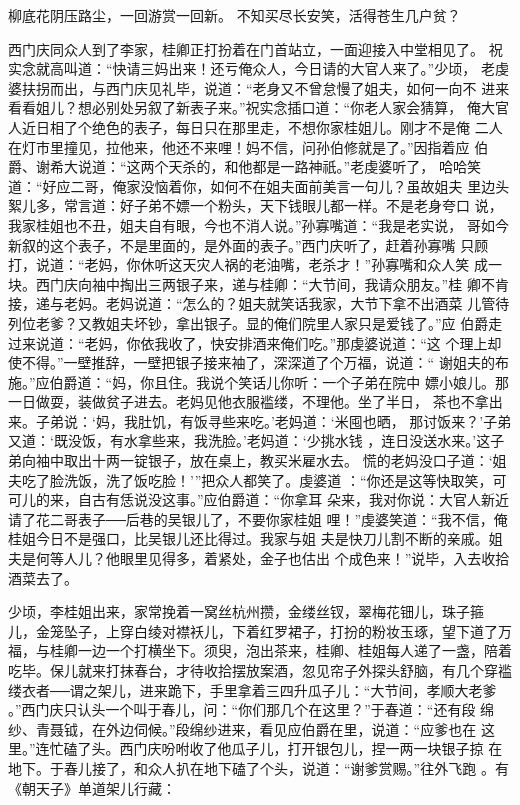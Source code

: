 柳底花阴压路尘，一回游赏一回新。
不知买尽长安笑，活得苍生几户贫？

西门庆同众人到了李家，桂卿正打扮着在门首站立，一面迎接入中堂相见了。
祝实念就高叫道：“快请三妈出来！还亏俺众人，今日请的大官人来了。”少顷，
老虔婆扶拐而出，与西门庆见礼毕，说道：“老身又不曾怠慢了姐夫，如何一向不
进来看看姐儿？想必别处另叙了新表子来。”祝实念插口道：“你老人家会猜算，
俺大官人近日相了个绝色的表子，每日只在那里走，不想你家桂姐儿。刚才不是俺
二人在灯市里撞见，拉他来，他还不来哩！妈不信，问孙伯修就是了。”因指着应
伯爵、谢希大说道：“这两个天杀的，和他都是一路神祇。”老虔婆听了，
哈哈笑道：“好应二哥，俺家没恼着你，如何不在姐夫面前美言一句儿？虽故姐夫
里边头絮儿多，常言道：好子弟不嫖一个粉头，天下钱眼儿都一样。不是老身夸口
说，我家桂姐也不丑，姐夫自有眼，今也不消人说。”孙寡嘴道：“我是老实说，
哥如今新叙的这个表子，不是里面的，是外面的表子。”西门庆听了，赶着孙寡嘴
只顾打，说道：“老妈，你休听这天灾人祸的老油嘴，老杀才！”孙寡嘴和众人笑
成一块。西门庆向袖中掏出三两银子来，递与桂卿：“大节间，我请众朋友。”桂
卿不肯接，递与老妈。老妈说道：“怎么的？姐夫就笑话我家，大节下拿不出酒菜
儿管待列位老爹？又教姐夫坏钞，拿出银子。显的俺们院里人家只是爱钱了。”应
伯爵走过来说道：“老妈，你依我收了，快安排酒来俺们吃。”那虔婆说道：“这
个理上却使不得。”一壁推辞，一壁把银子接来袖了，深深道了个万福，说道：“
谢姐夫的布施。”应伯爵道：“妈，你且住。我说个笑话儿你听：一个子弟在院中
嫖小娘儿。那一日做耍，装做贫子进去。老妈见他衣服褴缕，不理他。坐了半日，
茶也不拿出来。子弟说：‘妈，我肚饥，有饭寻些来吃。’老妈道：‘米囤也晒，
那讨饭来？’子弟又道：‘既没饭，有水拿些来，我洗脸。’老妈道：‘少挑水钱
，连日没送水来。’这子弟向袖中取出十两一锭银子，放在桌上，教买米雇水去。
慌的老妈没口子道：‘姐夫吃了脸洗饭，洗了饭吃脸！’”把众人都笑了。虔婆道
：“你还是这等快取笑，可可儿的来，自古有恁说没这事。”应伯爵道：“你拿耳
朵来，我对你说：大官人新近请了花二哥表子──后巷的吴银儿了，不要你家桂姐
哩！”虔婆笑道：“我不信，俺桂姐今日不是强口，比吴银儿还比得过。我家与姐
夫是快刀儿割不断的亲戚。姐夫是何等人儿？他眼里见得多，着紧处，金子也估出
个成色来！”说毕，入去收拾酒菜去了。

少顷，李桂姐出来，家常挽着一窝丝杭州攒，金缕丝钗，翠梅花钿儿，珠子箍
儿，金笼坠子，上穿白绫对襟袄儿，下着红罗裙子，打扮的粉妆玉琢，望下道了万
福，与桂卿一边一个打横坐下。须臾，泡出茶来，桂卿、桂姐每人递了一盏，陪着
吃毕。保儿就来打抹春台，才待收拾摆放案酒，忽见帘子外探头舒脑，有几个穿褴
缕衣者──谓之架儿，进来跪下，手里拿着三四升瓜子儿：“大节间，孝顺大老爹
。”西门庆只认头一个叫于春儿，问：“你们那几个在这里？”于春道：“还有段
绵纱、青聂钺，在外边伺候。”段绵纱进来，看见应伯爵在里，说道：“应爹也在
这里。”连忙磕了头。西门庆吩咐收了他瓜子儿，打开银包儿，捏一两一块银子掠
在地下。于春儿接了，和众人扒在地下磕了个头，说道：“谢爹赏赐。”往外飞跑
。有《朝天子》单道架儿行藏：

